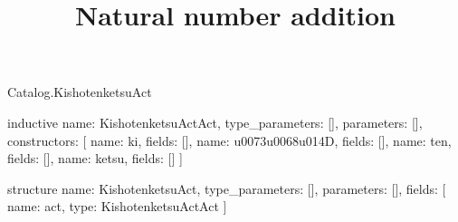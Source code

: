\begin{lexlean}{Catalog.KishotenketsuAct}
\title{Natural number addition}
\begin{semanticmodule}
inductive{
  name: KishotenketsuActAct,
  type_parameters: [],
  parameters: [],
  constructors: [
    {name: ki, fields: []},
    {name: u0073u0068u014D, fields: []},
    {name: ten, fields: []},
    {name: ketsu, fields: []}
  ]
}

structure{
  name: KishotenketsuAct,
  type_parameters: [],
  parameters: [],
  fields: [
    {name: act, type: KishotenketsuActAct}
  ]
}
\end{semanticmodule}
\end{lexlean}
